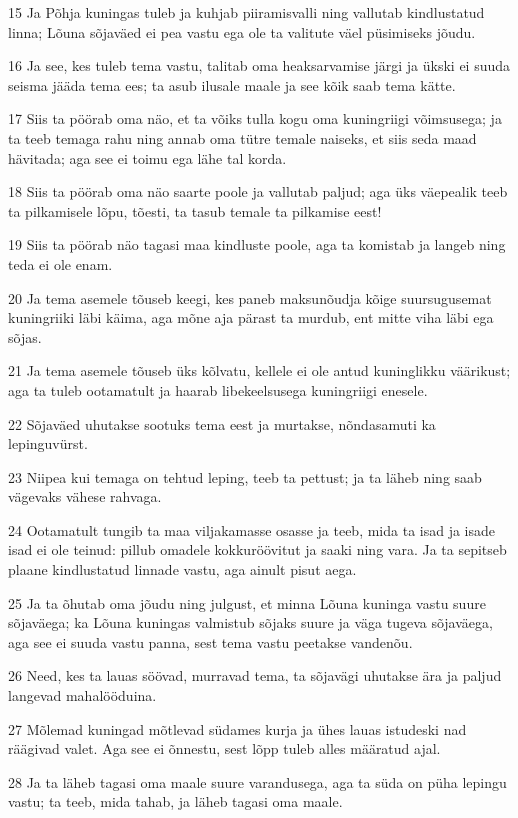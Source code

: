 \par 15 Ja Põhja kuningas tuleb ja kuhjab piiramisvalli ning vallutab kindlustatud linna; Lõuna sõjaväed ei pea vastu ega ole ta valitute väel püsimiseks jõudu.
\par 16 Ja see, kes tuleb tema vastu, talitab oma heaksarvamise järgi ja ükski ei suuda seisma jääda tema ees; ta asub ilusale maale ja see kõik saab tema kätte.
\par 17 Siis ta pöörab oma näo, et ta võiks tulla kogu oma kuningriigi võimsusega; ja ta teeb temaga rahu ning annab oma tütre temale naiseks, et siis seda maad hävitada; aga see ei toimu ega lähe tal korda.
\par 18 Siis ta pöörab oma näo saarte poole ja vallutab paljud; aga üks väepealik teeb ta pilkamisele lõpu, tõesti, ta tasub temale ta pilkamise eest!
\par 19 Siis ta pöörab näo tagasi maa kindluste poole, aga ta komistab ja langeb ning teda ei ole enam.
\par 20 Ja tema asemele tõuseb keegi, kes paneb maksunõudja kõige suursugusemat kuningriiki läbi käima, aga mõne aja pärast ta murdub, ent mitte viha läbi ega sõjas.
\par 21 Ja tema asemele tõuseb üks kõlvatu, kellele ei ole antud kuninglikku väärikust; aga ta tuleb ootamatult ja haarab libekeelsusega kuningriigi enesele.
\par 22 Sõjaväed uhutakse sootuks tema eest ja murtakse, nõndasamuti ka lepinguvürst.
\par 23 Niipea kui temaga on tehtud leping, teeb ta pettust; ja ta läheb ning saab vägevaks vähese rahvaga.
\par 24 Ootamatult tungib ta maa viljakamasse osasse ja teeb, mida ta isad ja isade isad ei ole teinud: pillub omadele kokkuröövitut ja saaki ning vara. Ja ta sepitseb plaane kindlustatud linnade vastu, aga ainult pisut aega.
\par 25 Ja ta õhutab oma jõudu ning julgust, et minna Lõuna kuninga vastu suure sõjaväega; ka Lõuna kuningas valmistub sõjaks suure ja väga tugeva sõjaväega, aga see ei suuda vastu panna, sest tema vastu peetakse vandenõu.
\par 26 Need, kes ta lauas söövad, murravad tema, ta sõjavägi uhutakse ära ja paljud langevad mahalööduina.
\par 27 Mõlemad kuningad mõtlevad südames kurja ja ühes lauas istudeski nad räägivad valet. Aga see ei õnnestu, sest lõpp tuleb alles määratud ajal.
\par 28 Ja ta läheb tagasi oma maale suure varandusega, aga ta süda on püha lepingu vastu; ta teeb, mida tahab, ja läheb tagasi oma maale.
